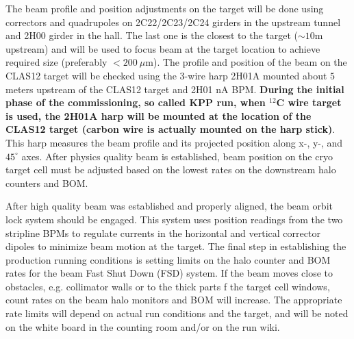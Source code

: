 The beam profile and position adjustments on the target will be done using correctors and quadrupoles on 2C22/2C23/2C24 girders in the upstream tunnel and 2H00 girder in the hall. The last one is the closest to the target ($\sim 10$m upstream) and will be used to focus beam at the target location to achieve required size (preferably $<200~\mu$m). The profile and position of the beam on the CLAS12 target will be checked using the 3-wire harp 2H01A mounted about $5$ meters upstream of the CLAS12 target and 2H01 nA BPM. {\bf During the initial phase of the commissioning, so called KPP run, when $^{12}$C wire target is used, the 2H01A harp will be mounted at the location of the CLAS12 target (carbon wire is actually mounted on the harp stick)}. This harp measures the beam profile and its projected position along x-, y-, and $45^\circ$ axes. After physics quality beam is established, beam position on the cryo target cell must be adjusted based on the lowest rates on the downstream halo counters and BOM. 

After high quality beam was established and properly aligned, 
the beam orbit lock system should be engaged. This system uses position readings from the two stripline BPMs to regulate 
currents in the horizontal and vertical corrector dipoles to minimize beam motion at the target.  The final step in establishing the production running conditions is setting 
limits on the halo counter and BOM rates for the beam Fast Shut Down (FSD) system. If the beam moves close to obstacles, e.g. 
collimator walls or to the thick parts f the target cell windows, count rates on the beam halo monitors and BOM will increase. The appropriate rate limits will depend on actual run conditions and the target, and will be noted on the white board in the counting room and/or on the run wiki.
